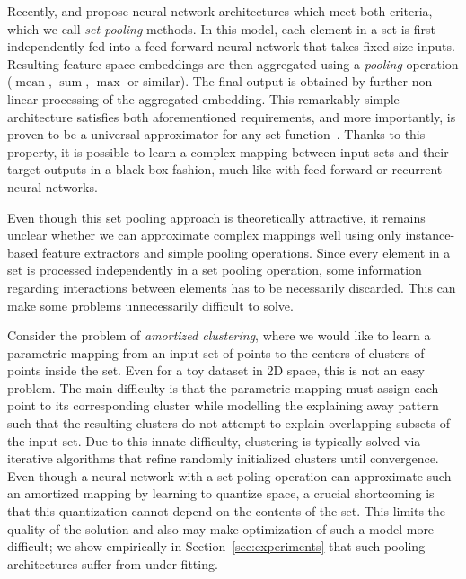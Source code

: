 Recently, \citet{Edwards2017} and \citet{Zaheer2017} propose neural network architectures which meet both criteria, which we call \emph{set pooling} methods.
In this model, each element in a set is first independently fed into a feed-forward neural network that takes fixed-size inputs.
Resulting feature-space embeddings are then aggregated using a \emph{pooling} operation ($\operatorname{mean}$, $\operatorname{sum}$, $\operatorname{max}$ or similar).
The final output is obtained by further non-linear processing of the aggregated embedding.
This remarkably simple architecture satisfies both aforementioned requirements, and more importantly, is proven to be a universal approximator for any set function~\citep{Zaheer2017}.
Thanks to this property, it is possible to learn a complex mapping between input sets and their target outputs in a black-box fashion, much like with feed-forward or recurrent neural networks.

Even though this set pooling approach is theoretically attractive, it remains unclear whether we can approximate complex mappings well using only instance-based feature extractors and simple pooling operations.
Since every element in a set is processed independently in a set pooling operation, some information regarding interactions between elements has to be necessarily discarded.
This can make some problems unnecessarily difficult to solve.

Consider the problem of \emph{amortized clustering}, where we would like to learn a parametric mapping from an input set of points to the centers of clusters of points inside the set.
Even for a toy dataset in 2D space, this is not an easy problem.
The main difficulty is that the parametric mapping must assign each point to its corresponding cluster while modelling the explaining away pattern such that the resulting clusters do not attempt to explain overlapping subsets of the input set.
Due to this innate difficulty, clustering is typically solved via iterative algorithms that refine randomly initialized clusters until convergence.
Even though a neural network with a set poling operation can approximate such an amortized mapping by learning to quantize space, a crucial shortcoming is that this quantization cannot depend on the contents of the set.
This limits the quality of the solution and also may make optimization of such a model more difficult;
we show empirically in Section~\ref{sec:experiments} that such pooling architectures suffer from under-fitting.

